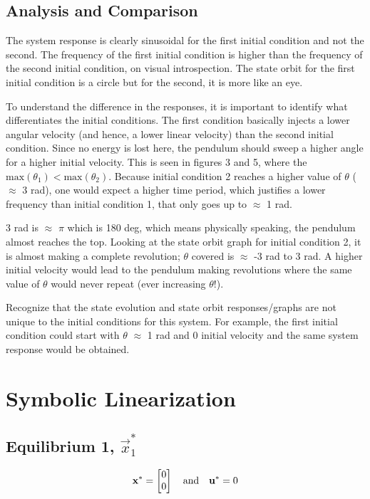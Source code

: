 \documentclass[10pt]{article}
\begin{document}
\subsection{Analysis and Comparison}
    The system response is clearly sinusoidal for the first initial condition and not the second. The frequency of the first initial condition is higher than the frequency of the second initial condition, on visual introspection. The state orbit for the first initial condition is a circle but for the second, it is more like an eye. 
    
    To understand the difference in the responses, it is important to identify what differentiates the initial conditions. The first condition basically injects a lower angular velocity (and hence, a lower linear velocity) than the second initial condition. Since no energy is lost here, the pendulum should sweep a higher angle for a higher initial velocity. This is seen in figures 3 and 5, where the \begin{math}
     \text{max}(\theta_1) < \text{max}(\theta_2)
    \end{math}. Because initial condition 2 reaches a higher value of $\theta$ ($\approx$ 3 rad), one would expect a higher time period, which justifies a lower frequency than initial condition 1, that only goes up to $\approx$ 1 rad. 
    
    3 rad is $\approx$ $\pi$ which is 180 deg, which means physically speaking, the pendulum almost reaches the top. Looking at the state orbit graph for initial condition 2, it is almost making a complete revolution; $\theta$ covered is $\approx$ -3 rad to 3 rad. A higher initial velocity would lead to the pendulum making revolutions where the same value of $\theta$ would never repeat (ever increasing $\theta$!). 
    
    Recognize that the state evolution and state orbit responses/graphs are not unique to the initial conditions for this system. For example, the first initial condition could start with $\theta$ $\approx$ 1 rad and 0 initial velocity and the same system response would be obtained. 
    

\section{Symbolic Linearization}

\subsection{Equilibrium 1, \texorpdfstring{$\vec{x}_1^*$}{x1*}}
    \begin{equation*}
         \mathbf{x}^* = \begin{bmatrix} 0\\0 \end{bmatrix}
         \quad
         \text{and}
         \quad
         \mathbf{u}^* = 0
    \end{equation*}
\end{document}
